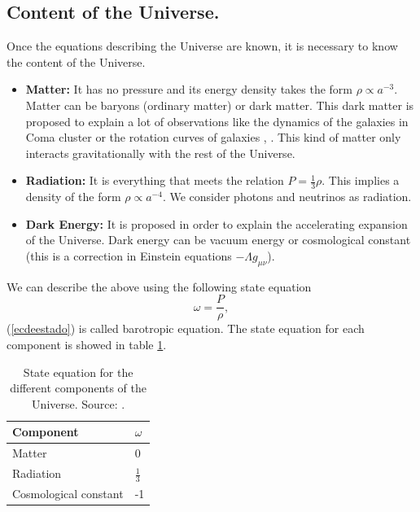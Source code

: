 \documentclass[onecolumn,           %
               showpacs,            %
               preprintnumbers,     %
               aps,                 %
               letterpaper,             %
               superscriptaddress,      %
               nofootinbib,         %
               tightenlines,        %
               floats,floatfix      %
               ,usenatbib,
               ]{revtex4-1}
\begin{document}
\subsection{Content of the Universe.}
Once the equations describing the Universe are known, it is necessary to know the content of the Universe.
\begin{itemize}
	\item \textbf{Matter:} It has no pressure and its energy density takes the form $\rho \propto a^{-3}.$ Matter can be baryons (ordinary matter) or dark matter. This dark matter is proposed to explain a lot of observations like the dynamics of the galaxies in Coma cluster or the rotation curves of galaxies \cite{liddle}, \cite{retos}. This kind of matter only interacts gravitationally with the rest of the Universe.
	\item \textbf{Radiation:} It is everything that meets the relation $P = \frac{1}{3} \rho$. This implies a density of the form $\rho \propto a^{-4}$. We consider photons and neutrinos as radiation.
	\item \textbf{Dark Energy:} It is proposed in order to explain the accelerating expansion of the Universe. Dark energy can be vacuum energy or cosmological constant (this is a correction in Einstein equations $-\Lambda g_{\mu \nu}$).
\end{itemize}

We can describe the above using the following state equation
\begin{equation}
\label{ecdeestado}
\omega = \frac{P}{\rho},
\end{equation}
(\ref{ecdeestado}) is called barotropic equation. The state equation for each component is showed in table \ref{state}.
\begin{table} [htbp]
	\begin{center}
		\begin{tabular}{|l|l|}
			\hline
			Component & $\omega$\\
			\hline
			Matter & 0 \\
			\hline
			Radiation & $\frac{1}{3}$\\
			\hline
			Cosmological constant & -1 \\
			\hline
		\end{tabular}
		\caption{State equation for the different components of the Universe. Source: \cite{cambridge}.}
		\label{state}
	\end{center}
\end{table} 
\end{document}
